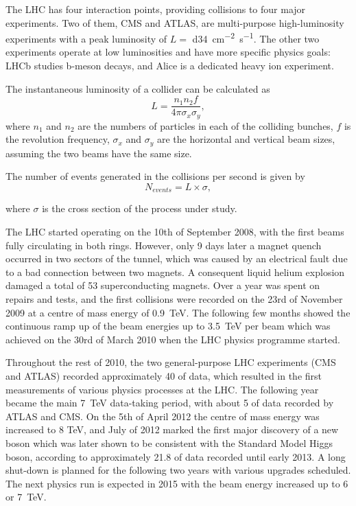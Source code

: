 The LHC has four interaction points, providing collisions to four major experiments. Two of them, CMS and ATLAS, are
multi-purpose high-luminosity experiments with a peak luminosity of $L = $ \SI{d34}{\cm^{-2} s^{-1}}. The other two
experiments operate at low luminosities and have more specific physics goals: LHCb studies b-meson decays, and Alice is
a dedicated heavy ion experiment.

The instantaneous luminosity of a collider can be calculated as
\begin{equation}
	L = \frac{n_1 n_2 f}{4 \pi \sigma_x \sigma_y},
\end{equation}
where $n_1$ and $n_2$ are the numbers of particles in each of the colliding bunches, $f$ is the revolution frequency,
$\sigma_x$ and $\sigma_y$ are the horizontal and vertical beam sizes, assuming the two beams have the same size.

The number of events generated in the collisions per second is given by
\begin{equation}
	N_{events} = L \times \sigma,
\end{equation}

where $\sigma$ is the cross section of the process under study.


The LHC started operating on the 10th of September 2008, with the first beams fully circulating in both rings. However,
only 9 days later a magnet quench occurred in two sectors of the tunnel, which was caused by an electrical fault due to
a bad connection between two magnets. A consequent liquid helium explosion damaged a total of 53 superconducting
magnets. Over a year was spent on repairs and tests, and the first collisions were recorded on the 23rd of November 2009
at a centre of mass energy of \SI{0.9}{\TeV}. The following few months showed the continuous ramp up of the beam
energies up to \SI{3.5}{\TeV} per beam which was achieved on the 30rd of March 2010 when the LHC physics programme
started.

Throughout the rest of 2010, the two general-purpose LHC experiments (CMS and ATLAS) recorded approximately
\SI{40}{\invpb} of data, which resulted in the first measurements of various physics processes at the LHC. The following
year became the main \SI{7}{\TeV} data-taking period, with about \SI{5}{\invfb} of data recorded by ATLAS and CMS. On
the 5th of April 2012 the centre of mass energy was increased to 8 TeV, and July of 2012 marked the first major
discovery of a new boson which was later shown to be consistent with the Standard Model Higgs boson, according to
approximately \SI{21.8}{\invfb} of data recorded until early 2013. A long shut-down is planned for the following two
years with various upgrades scheduled. The next physics run is expected in 2015 with the beam energy increased up to 6
or \SI{7}{\TeV}.

